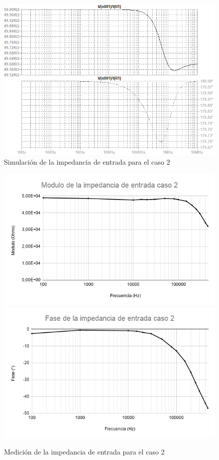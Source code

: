 \begin{figure}[H]
\begin{centering}
\includegraphics[scale=0.5]{../Ex1/ib/Resources1b/zinp2_sim}
\par\end{centering}
\caption{Simulación de la impedancia de entrada para el caso 2}
\end{figure}

\begin{figure}[H]
\begin{centering}
\includegraphics[scale=0.4]{../Ex1/ib/Resources1b/zinp2_m_med}\includegraphics[scale=0.4]{../Ex1/ib/Resources1b/zinp2_p_med}
\par\end{centering}
\caption{Medición de la impedancia de entrada para el caso 2}
\end{figure}

